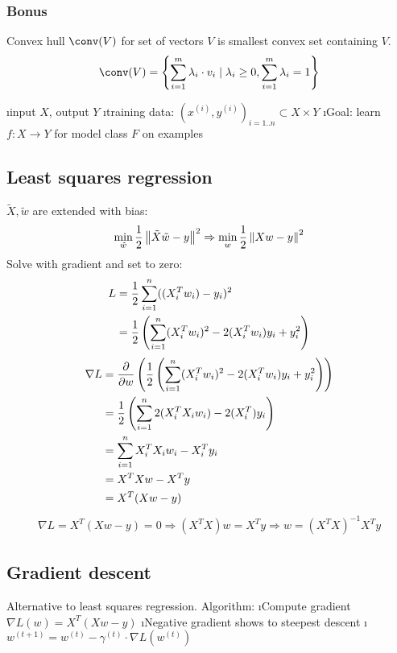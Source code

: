 \subsubsection{Bonus}

Convex hull $\conv(V)$ for set of vectors $V$ is smallest convex set containing $V$.
\[ \conv(V) = \left\{\dsum^m_{i=1} \lambda_i \cdot v_i \mid \lambda_i \geq 0, \dsum^m_{i=1} \lambda_i = 1\right\} \]


\bi
\i input $X$, output $Y$
\i training data: $(x^{(i)}, y^{(i)})_{i=1..n} \subset X \times Y$
\i Goal: learn $f: X \to Y$ for model class $F$ on examples
\ei

\subsection{Least squares regression}
$\tilde X, \tilde w$ are extended with bias:
\begin{align*}
\min_{\tilde w} \frac{1}{2} \left\lVert\tilde X \tilde w - y\right\rVert^2 \Rightarrow \min_w \frac{1}{2} \left\lVert Xw-y\right\rVert^2
\end{align*}
Solve with gradient and set to zero:
\begin{align*}
L &= \frac{1}{2} \displaystyle\sum_{i=1}^n ((X_i^Tw_i)-y_i)^2 \\
&= \frac{1}{2} \left(\displaystyle\sum_{i=1}^n (X_i^Tw_i)^2 - 2(X_i^Tw_i)y_i + y_i^2 \right) \\
\end{align*}
\begin{align*}
  \nabla L &= \frac{\partial}{\partial w} \left(  \frac{1}{2} \left(\displaystyle\sum_{i=1}^n (X_i^Tw_i)^2 - 2(X_i^Tw_i)y_i + y_i^2 \right) \right)\\
  &= \frac{1}{2} \left(\displaystyle\sum_{i=1}^n 2(X_i^TX_iw_i) - 2(X_i^T)y_i \right)\\
  &= \displaystyle\sum_{i=1}^n X_i^TX_iw_i - X_i^Ty_i\\
  &= X^TXw - X^Ty\\
  &= X^T(Xw-y)
\end{align*}
\begin{align*}
\nabla L = X^T(Xw-y) = 0 \Rightarrow (X^TX)w = X^Ty \Rightarrow w = (X^TX)^{-1}X^Ty
\end{align*}

\subsection{Gradient descent}
Alternative to least squares regression. Algorithm:
\be
\i Compute gradient $\nabla L(w) = X^T(Xw-y)$
\i Negative gradient shows to steepest descent
\i $w^{(t+1)} = w^{(t)} - \gamma^{(t)} \cdot \nabla L(w^{(t)})$
\ee

